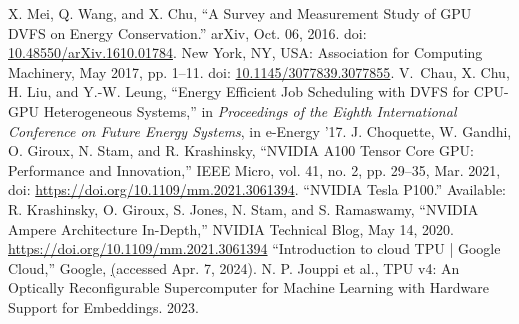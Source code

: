 \begin{thebibliography}{00}
     X. Mei, Q. Wang, and X. Chu, ``A Survey and Measurement Study of GPU DVFS on Energy Conservation.'' arXiv, Oct. 06, 2016. doi: \href{https://doi.org/10.48550/arXiv.1610.01784}{10.48550/arXiv.1610.01784}. New York, NY, USA: Association for Computing Machinery, May 2017, pp. 1–11. doi: \href{https://doi.org/10.1145/3077839.3077855}{10.1145/3077839.3077855}.
     V. Chau, X. Chu, H. Liu, and Y.-W. Leung, “Energy Efficient Job Scheduling with DVFS for CPU-GPU Heterogeneous Systems,” in \textit{Proceedings of the Eighth International Conference on Future Energy Systems}, in e-Energy ’17.
     J. Choquette, W. Gandhi, O. Giroux, N. Stam, and R. Krashinsky, “NVIDIA A100 Tensor Core GPU: Performance and Innovation,” IEEE Micro, vol. 41, no. 2, pp. 29–35, Mar. 2021, doi: \href{https://doi.org/10.1109/mm.2021.3061394}{https://doi.org/10.1109/mm.2021.3061394}.
     “NVIDIA Tesla P100.” Available: \href{https://images.nvidia.com/content/pdf/tesla/whitepaper/pascal-architecture whitepaper.pdf}
     R. Krashinsky, O. Giroux, S. Jones, N. Stam, and S. Ramaswamy, “NVIDIA Ampere Architecture In-Depth,” NVIDIA Technical Blog, May 14, 2020. \href{https://developer.nvidia.com/blog/nvidia-ampere-architecture-in-depth/}{https://doi.org/10.1109/mm.2021.3061394}
     “Introduction to cloud TPU  |  Google Cloud,” Google, \href{https://cloud.google.com/tpu/docs/intro-to-tpu} (accessed Apr. 7, 2024). 
     N. P. Jouppi et al., TPU v4: An Optically Reconfigurable Supercomputer for Machine Learning with Hardware Support for Embeddings. 2023.
\end{thebibliography}
